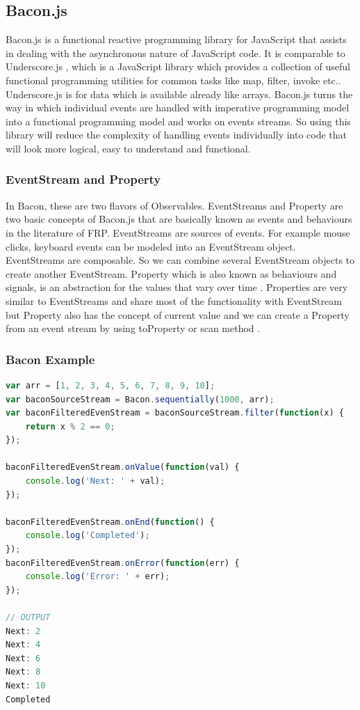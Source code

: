 \subsection{Bacon.js}
Bacon.js is a functional reactive programming library for JavaScript that assists in dealing with the asynchronous nature of JavaScript code. It is comparable to Underscore.js \cite{Underscorejs}, which is a JavaScript library which provides a collection of useful functional programming utilities for common tasks like map, filter, invoke etc..
Underscore.js is for data which is available already like arrays. Bacon.js turns the way  in which individual events are handled with imperative programming model into a functional programming model and works on events streams. So using this library will reduce the complexity of handling events individually into code that will look more logical, easy to understand and functional.

\subsubsection{EventStream and Property}
In Bacon, these are two flavors of Observables. EventStreams and Property are two basic concepts of Bacon.js that are basically known as events and behaviours in the literature of FRP.
EventStreams are sources of events. For example mouse clicks, keyboard events can be modeled into an EventStream object. EventStreams are composable. So we can combine several EventStream objects to create another EventStream.
Property which is also known as behaviours and signals, is an abstraction for the values that vary over time \cite{GithubFRP}.
Properties are very similar to EventStreams and share most of the functionality with EventStream but Property also has the concept of current value and we can create a Property from an event stream by using toProperty or scan method \cite{BaconProperty}.

\subsubsection{Bacon Example}
\begin{lstlisting}[language=JavaScript, caption=Bacon.js Example , label={lst:Bacon_Simple_Example}]
var arr = [1, 2, 3, 4, 5, 6, 7, 8, 9, 10];
var baconSourceStream = Bacon.sequentially(1000, arr);
var baconFilteredEvenStream = baconSourceStream.filter(function(x) {
	return x % 2 == 0;
});

baconFilteredEvenStream.onValue(function(val) {
	console.log('Next: ' + val);
});

baconFilteredEvenStream.onEnd(function() {
	console.log('Completed');
});
baconFilteredEvenStream.onError(function(err) {
	console.log('Error: ' + err);
});

// OUTPUT
Next: 2
Next: 4
Next: 6
Next: 8
Next: 10
Completed

\end{lstlisting}

